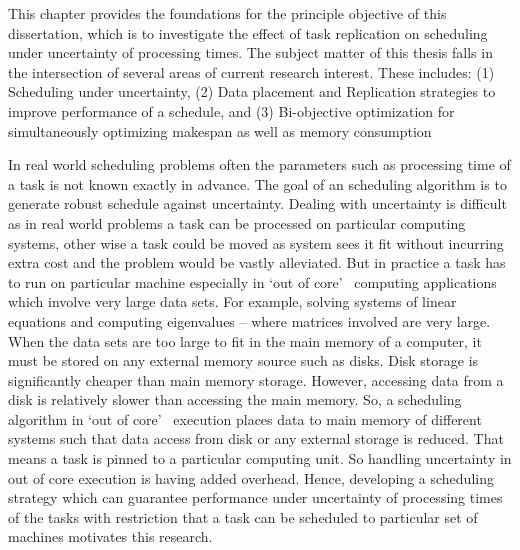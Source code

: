\documentclass[12pt]{article}
\theoremstyle{mystyle}
\begin{document}
  \listofcontentsfigurestables






\startbody


\label{ch1}

This chapter provides the foundations for the principle objective of this dissertation,
which is to investigate the effect of task replication on scheduling under uncertainty of processing times.  The subject matter of this thesis falls in the intersection of several areas of current research interest.  These includes: (1)  Scheduling under uncertainty, (2) Data placement and Replication strategies to improve performance of a schedule, and (3) Bi-objective optimization for simultaneously optimizing makespan as well as memory consumption


\label{ch1-motivation}
In real world scheduling problems often the parameters such as processing time of a task is not known exactly in advance. The goal of an scheduling algorithm is to generate robust schedule against uncertainty. Dealing with uncertainty is difficult as in real world problems a task can be processed on particular computing systems, other wise a task could be moved as system sees it fit without incurring extra cost and the problem would be vastly alleviated. But in practice a task has to run on particular machine especially in \textquoteleft out of core\textquoteright~ computing applications which involve very large data sets. For example, solving systems of linear equations and computing eigenvalues – where matrices involved are very large. When the data sets are too large to fit in the main memory of a computer, it must be stored on any external memory source such as disks. Disk storage is significantly cheaper than main memory storage. However, accessing data from a disk is relatively slower than accessing the main memory. So, a scheduling algorithm in \textquoteleft out of core\textquoteright~ execution places data to main memory of different systems such that data access from disk or any external storage is reduced. That means a task is pinned to a particular computing unit. So handling uncertainty in out of core execution is having added overhead. Hence, developing a scheduling strategy which can guarantee performance under uncertainty of processing times of the tasks with restriction that a task can be scheduled to particular set of machines motivates this research.
\end{document}
